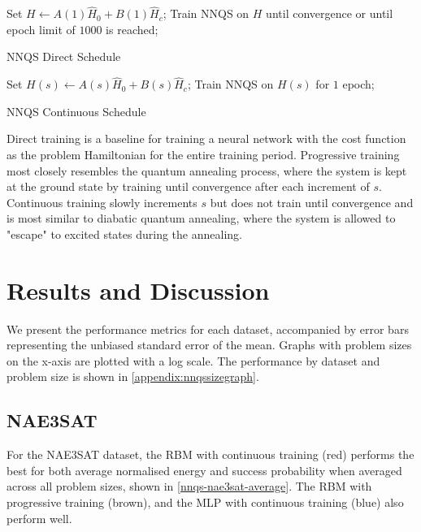\begin{algorithm}
    \begin{algorithmic}
    \State Set $H \leftarrow A(1)\hat{H}_0 + B(1)\hat{H}_c$;
    \State Train NNQS on $H$ until convergence or until epoch limit of $1000$ is reached;
    \end{algorithmic}
    \caption{NNQS Direct Schedule}
    \label{alg:direct}
\end{algorithm}

\begin{algorithm}
    \begin{algorithmic}
    \State Set $H(s) \leftarrow A(s)\hat{H}_0 + B(s)\hat{H}_c$;
    \State Train NNQS on $H(s)$ for $1$ epoch;
    \EndFor
    \end{algorithmic}
    \caption{NNQS Continuous Schedule}
    \label{alg:continuous}
\end{algorithm}

Direct training is a baseline for training a neural network with the cost function as the problem Hamiltonian for the entire training period. Progressive training most closely resembles the quantum annealing process, where the system is kept at the ground state by training until convergence after each increment of $s$. Continuous training slowly increments $s$ but does not train until convergence and is most similar to diabatic quantum annealing, where the system is allowed to "escape" to excited states during the annealing.

\section{Results and Discussion}
We present the performance metrics for each dataset, accompanied by error bars representing the unbiased standard error of the mean. Graphs with problem sizes on the x-axis are plotted with a log scale. The performance by dataset and problem size is shown in \autoref{appendix:nnqssizegraph}.

\subsection{NAE3SAT}
For the NAE3SAT dataset, the RBM with continuous training (red) performs the best for both average normalised energy and success probability when averaged across all problem sizes, shown in \autoref{nnqs-nae3sat-average}. The RBM with progressive training (brown), and the MLP with continuous training (blue) also perform well.


